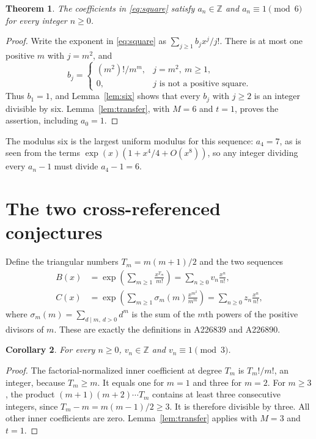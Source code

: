 \documentclass[11pt]{article}
\newtheorem{theorem}{Theorem}
\newtheorem{corollary}[theorem]{Corollary}
\DeclareMathOperator{\ex}{exp}
\begin{document}
\begin{theorem}\label{thm:square}
The coefficients in \eqref{eq:square} satisfy $a_n\in\mathbb Z$ and
$a_n\equiv1\pmod6$ for every integer $n\geq0$.
\end{theorem}
\begin{proof}
Write the exponent in \eqref{eq:square} as $\sum_{j\geq1}b_jx^j/j!$.
There is at most one positive $m$ with $j=m^2$, and
\[
 b_j=\begin{cases}(m^2)!/m^m,&j=m^2,\ m\geq1,\\
                   0,&j\text{ is not a positive square}.
       \end{cases}
\]
Thus $b_1=1$, and Lemma~\ref{lem:six} shows that every $b_j$ with $j\geq2$
is an integer divisible by six. Lemma~\ref{lem:transfer}, with $M=6$ and
$t=1$, proves the assertion, including $a_0=1$.
\end{proof}

The modulus six is the largest uniform modulus for this sequence:
$a_4=7$, as is seen from the terms $\ex(x)(1+x^4/4+O(x^8))$,
so any integer dividing every $a_n-1$ must divide $a_4-1=6$.
\section{The two cross-referenced conjectures}

Define the triangular numbers $T_m=m(m+1)/2$ and the two sequences
\begin{align}
 B(x)&=\ex\!\left(\sum_{m\geq1}\frac{x^{T_m}}{m!}\right)
      =\sum_{n\geq0}v_n\frac{x^n}{n!},\label{eq:triangular}\\
 C(x)&=\ex\!\left(\sum_{m\geq1}\sigma_m(m)\frac{x^{m^2}}{m^m}\right)
      =\sum_{n\geq0}z_n\frac{x^n}{n!},\label{eq:weighted}
\end{align}
where $\sigma_m(m)=\sum_{d\mid m,\ d>0}d^m$ is the sum of the $m$th powers
of the positive divisors of $m$.
These are exactly the definitions in A226839 and A226890.

\begin{corollary}\label{cor:triangular}
For every $n\geq0$, $v_n\in\mathbb Z$ and $v_n\equiv1\pmod3$.
\end{corollary}
\begin{proof}
The factorial-normalized inner coefficient at degree $T_m$ is
$T_m!/m!$, an integer, because $T_m\geq m$.
It equals one for $m=1$ and three for $m=2$.
For $m\geq3$, the product $(m+1)(m+2)\cdots T_m$ contains
at least three consecutive integers, since $T_m-m=m(m-1)/2\geq3$.
It is therefore divisible by three. All other inner coefficients are zero.
Lemma~\ref{lem:transfer} applies with $M=3$ and $t=1$.
\end{proof}
\end{document}
